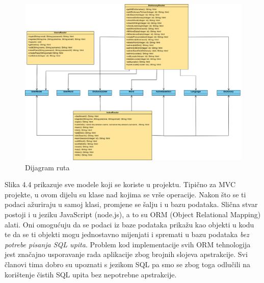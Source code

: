 				\begin{figure}[H]
					\includegraphics[width=1.1\textwidth]{dijagrami/slika2.png} 
					\centering
					\caption{Dijagram ruta}
					\label{fig:class_diagram}
				\end{figure}			
			\eject
            Slika 4.4 prikazuje sve modele koji se koriste u projektu. Tipično za MVC projekte, u ovom dijelu su klase nad kojima se vrše operacije. Nakon što se ti podaci ažuriraju u samoj klasi, promjene se šalju i u bazu podataka.
            Slična stvar postoji i u jeziku JavaScript (node.js), a to su ORM (Object Relational Mapping) alati. Oni omogućuju da se podaci iz baze podataka prikažu kao objekti u kodu te da se ti objekti mogu jednostavno mijenjati i spremati u bazu podataka \textit{bez potrebe pisanja SQL upita}.
            Problem kod implementacije svih ORM tehnologija jest značajno usporavanje rada aplikacije zbog brojnih slojeva apstrakcije. Svi članovi tima dobro su upoznati s jezikom SQL pa smo se zbog toga odlučili na korištenje čistih SQL upita bez nepotrebne apstrakcije.
